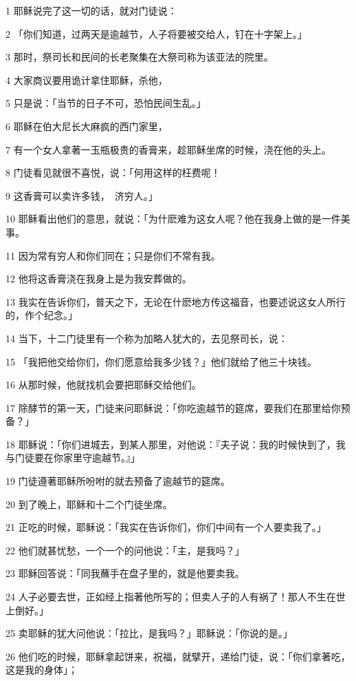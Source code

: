\par 1 耶稣说完了这一切的话，就对门徒说：
\par 2 「你们知道，过两天是逾越节，人子将要被交给人，钉在十字架上。」
\par 3 那时，祭司长和民间的长老聚集在大祭司称为该亚法的院里。
\par 4 大家商议要用诡计拿住耶稣，杀他，
\par 5 只是说：「当节的日子不可，恐怕民间生乱。」
\par 6 耶稣在伯大尼长大麻疯的西门家里，
\par 7 有一个女人拿著一玉瓶极贵的香膏来，趁耶稣坐席的时候，浇在他的头上。
\par 8 门徒看见就很不喜悦，说：「何用这样的枉费呢！
\par 9 这香膏可以卖许多钱，　济穷人。」
\par 10 耶稣看出他们的意思，就说：「为什麽难为这女人呢？他在我身上做的是一件美事。
\par 11 因为常有穷人和你们同在；只是你们不常有我。
\par 12 他将这香膏浇在我身上是为我安葬做的。
\par 13 我实在告诉你们，普天之下，无论在什麽地方传这福音，也要述说这女人所行的，作个纪念。」
\par 14 当下，十二门徒里有一个称为加略人犹大的，去见祭司长，说：
\par 15 「我把他交给你们，你们愿意给我多少钱？」他们就给了他三十块钱。
\par 16 从那时候，他就找机会要把耶稣交给他们。
\par 17 除酵节的第一天，门徒来问耶稣说：「你吃逾越节的筵席，要我们在那里给你预备？」
\par 18 耶稣说：「你们进城去，到某人那里，对他说：『夫子说：我的时候快到了，我与门徒要在你家里守逾越节。』」
\par 19 门徒遵著耶稣所吩咐的就去预备了逾越节的筵席。
\par 20 到了晚上，耶稣和十二个门徒坐席。
\par 21 正吃的时候，耶稣说：「我实在告诉你们，你们中间有一个人要卖我了。」
\par 22 他们就甚忧愁，一个一个的问他说：「主，是我吗？」
\par 23 耶稣回答说：「同我蘸手在盘子里的，就是他要卖我。
\par 24 人子必要去世，正如经上指著他所写的；但卖人子的人有祸了！那人不生在世上倒好。」
\par 25 卖耶稣的犹大问他说：「拉比，是我吗？」耶稣说：「你说的是。」
\par 26 他们吃的时候，耶稣拿起饼来，祝福，就擘开，递给门徒，说：「你们拿著吃，这是我的身体」；
